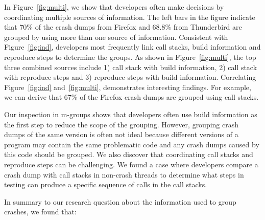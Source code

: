 \documentclass{llncs}
\begin{document}

In Figure~\ref{fig:multi}, we show that developers often make decisions by coordinating multiple sources of information. The left bars in the figure indicate that 70\% of the crash dumps from Firefox and 68.8\% from Thunderbird are grouped by using more than one source of information. Consistent with Figure~\ref{fig:ind}, developers most frequently link call stacks, build information and reproduce steps to determine the groups. As shown in Figure~\ref{fig:multi}, the top three combined sources include 1) call stack with build information, 2) call stack with reproduce steps and 3) reproduce steps with build information. Correlating Figure~\ref{fig:ind} and~\ref{fig:multi}, demonstrates interesting findings. For example, we can derive that 67\% of the Firefox crash dumps are grouped using call stacks.


Our inspection in m-groups shows that developers often use build information as the first step to reduce the scope of the grouping. However, grouping crash dumps of the same version is often not ideal because different versions of a program may contain the same problematic code and any crash dumps caused by this code should be grouped. We also discover that coordinating call stacks and reproduce steps can be challenging. We found a case where developers compare a crash dump with call stacks in non-crash threads to determine what steps in testing can produce a specific sequence of calls in the call stacks.

In summary to our research question about the information used to group crashes, we found that:
\end{document}
